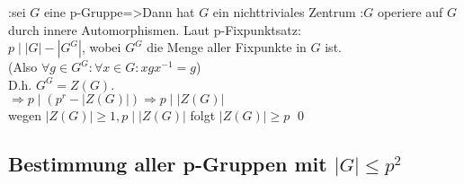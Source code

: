 :{sei $G$ eine p-Gruppe}=>{Dann hat $G$ ein nichttriviales Zentrum}
\proof{}:{$G$ operiere auf $G$ durch innere Automorphismen. Laut p-Fixpunktsatz: \\
          $p\mid |G|-|G^G|$, wobei $G^G$ die Menge aller Fixpunkte in $G$ ist. \\
		  (Also $\forall g\in G^G: \forall x\in G: xgx^{-1}=g$)\\
		  D.h. $G^G=Z(G)$.\\
		  $\Rightarrow p \mid (p^r-|Z(G)|)\Rightarrow p \mid |Z(G)|$ \\
		  wegen $|Z(G)|\geq 1, p \mid |Z(G)|$ 
		  folgt $|Z(G)|\geq p$ \qed
         }
\subsection{Bestimmung aller p-Gruppen mit $|G|\leq p^2$}

